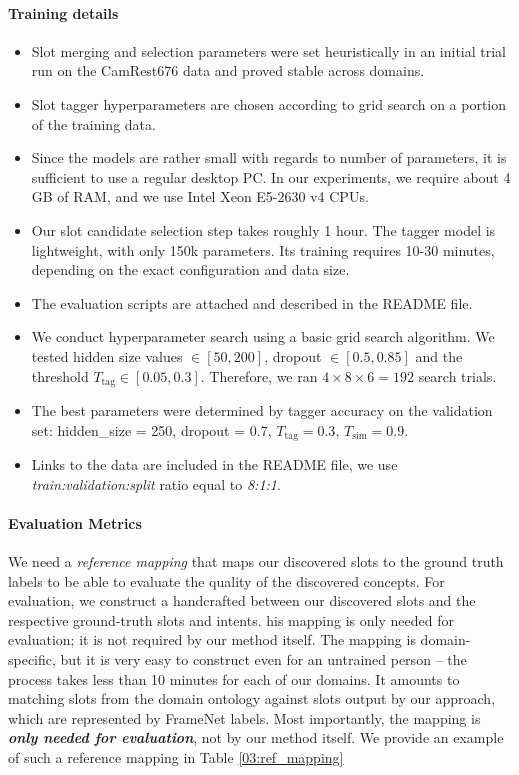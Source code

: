 \paragraph{Training details}
\begin{itemize}
    \item Slot merging and selection parameters were set heuristically in an initial trial run on the CamRest676 data and proved stable across domains.
    \item Slot tagger hyperparameters are chosen according to grid search on a portion of the training data.
    \item Since the models are rather small with regards to number of parameters, it is sufficient to use a regular desktop PC. In our experiments, we require about 4 GB of RAM, and we use Intel Xeon E5-2630 v4 CPUs. 
    \item Our slot candidate selection step takes roughly 1 hour.
    The tagger model is lightweight, with only 150k parameters. Its training requires 10-30 minutes, depending on the exact configuration and data size.
    \item The evaluation scripts are attached and described in the README file.
    \item We conduct hyperparameter search using a basic grid search algorithm. We tested hidden size values $\in [50,200]$, dropout $\in [0.5,0.85]$ and the threshold $T_{\text{tag}} \in [0.05,0.3]$. Therefore, we ran $4\times8\times6 = 192$ search trials.
    \item The best parameters were determined by tagger accuracy on the validation set: hidden\_size = 250, dropout = 0.7, $T_{\text{tag}} = 0.3$, $T_{\text{sim}} = 0.9$.
    \item Links to the data are included in the README file, we use \emph{train:validation:split} ratio equal to \emph{8:1:1}.
\end{itemize}

\paragraph{Evaluation Metrics}
We need a \textit{reference mapping} that maps our discovered slots to the ground truth labels to be able to evaluate the quality of the discovered concepts.
For evaluation, we construct a handcrafted  between our discovered slots and the respective ground-truth slots and intents.
his mapping is only needed for evaluation; it is not required by our method itself.
The mapping is domain-specific, but it is very easy to construct even for an untrained person -- the process takes less than 10 minutes for each of our domains.
It amounts to matching slots from the domain ontology against slots output by our approach, which are represented by FrameNet labels.
Most importantly, the mapping is \textbf{\emph{only needed for evaluation}}, not by our method itself.
We provide an example of such a reference mapping in Table \ref{03:ref_mapping}
\label{sec:app-ref-mapping}

